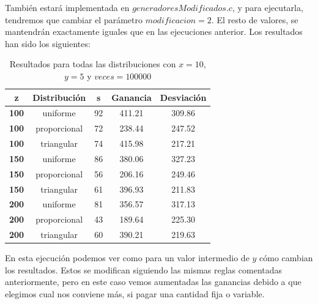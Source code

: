 \documentclass[11pt,a4paper]{report}
\begin{document}
También estará implementada en $generadoresModificados.c$, y para ejecutarla, tendremos que cambiar el parámetro $modificacion=2$. El resto
de valores, se mantendrán exactamente iguales que en las ejecuciones anterior. Los resultados han sido los siguientes:

\begin{table}[H]
	\centering
	\begin{tabular}{c|cccc}
	\textbf{\hspace{5mm}z\hspace{5mm}}   & \textbf{Distribución} & \textbf{\hspace{5mm}s\hspace{5mm}} & \textbf{Ganancia} & \textbf{Desviación} \\ \hline
	\textbf{100} & uniforme 			 & 92         & 411.21            & 309.86 			  \\
	\textbf{100} & proporcional			 & 72         & 238.44            & 247.52			  \\
	\textbf{100} & triangular 			 & 74         & 415.98            & 217.21			  \\ \hline
	\textbf{150} & uniforme 			 & 86         & 380.06            & 327.23 			  \\
	\textbf{150} & proporcional			 & 56         & 206.16            & 249.46			  \\
	\textbf{150} & triangular 		     & 61         & 396.93            & 211.83			  \\ \hline
	\textbf{200} & uniforme 			 & 81         & 356.57            & 317.13 			  \\
	\textbf{200} & proporcional		     & 43         & 189.64            & 225.30			  \\
	\textbf{200} & triangular 		     & 60         & 390.21            & 219.63			  \\
	\end{tabular}
	\caption{Resultados para todas las distribuciones con $x=10$, $y=5$ y $veces=100000$}
\end{table}

En esta ejecución podemos ver como para un valor intermedio de $y$ cómo cambian los resultados. Estos se modifican siguiendo las mismas reglas comentadas
anteriormente, pero en este caso vemos aumentadas las ganancias debido a que elegimos cual nos conviene más, si pagar una cantidad fija o variable.
\end{document}
